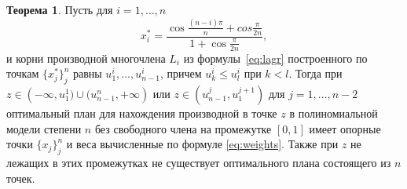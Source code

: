 \documentclass[specialist,
               substylefile = spbu.rtx,
               subf,href,colorlinks=true, 12pt]{disser}
\theoremstyle{definition}
\newtheorem{theorem}{Теорема}
\begin{document}
	\begin{theorem}
	\label{th1}
		Пусть для $i = 1, \ldots, n$ 
		\begin{equation}
			\label{eq:th1:points}
			x_i^* = \frac{\cos \frac{(n - i) \pi}{n} + cos \frac{\pi}{2n}}{1 + \cos \frac{\pi}{2n}} ,
		\end{equation}
		и корни производной многочлена $L_i$ из формулы~\eqref{eq:lagr} построенного по точкам $\{x_j^*\}_j^n$ равны $u_1^i, \ldots, u_{n-1}^i$, причем $u_k^i \leqslant u_l^i$ при $k < l$. Тогда при $z \in \left(-\infty, u_1^1) \cup (u_{n-1}^n, +\infty \right)$ или $z \in \left( u_{n-1}^j, u_1^{j+1} \right)$ для $j=1, \ldots, n-2$ оптимальный план для нахождения производной в точке $z$ в полиномиальной модели степени $n$ без свободного члена на промежутке $[0, 1]$ имеет опорные точки $\{x_j\}_j^n$ и веса вычисленные по формуле \eqref{eq:weights}. Также при $z$ не лежащих в этих промежутках не существует оптимального плана состоящего из $n$ точек.
	\end{theorem}
\end{document}
